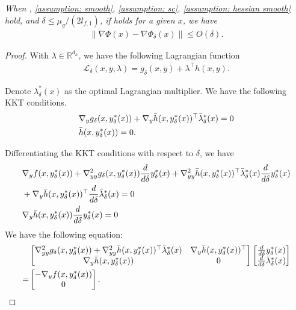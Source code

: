 \documentclass{article}
\newcommand{\Lc}{\mathcal{L}}
\def\R{\mathbb{R}}
\theoremstyle{plain}
\theoremstyle{definition}
\theoremstyle{remark}
\begin{document}
\subsection*{}
\emph{When , \ref{assumption: smooth}, \ref{assumption: sc}, \ref{assumption: hessian smooth} hold, and $\delta \leq \mu_g/(2l_{f,1})$, if  holds for a given $x$, we have
    \begin{align*}
        \|\nabla \Phi(x)-\nabla \Phi_\delta(x)\|\leq O(\delta).
    \end{align*}}

\begin{proof}

With $\lambda\in \R^{d_h}$, we have the following Lagrangian function
\begin{align*}
    \Lc_\delta(x,y, \lambda)=g_\delta(x,y) + \lambda^\top h(x,y).
\end{align*}

Denote $\lambda_\delta^*(x)$ as the optimal Lagrangian multiplier. We have the following KKT conditions.
\begin{align*}
    &\nabla_y g_\delta(x, y^*_\delta(x))+\nabla_y\Bar{h}(x,y^*_\delta(x))^\top \Bar{\lambda}^*_\delta(x)=0\\
    &\Bar{h}(x,y^*_\delta(x))=0.
\end{align*}



Differentiating the KKT conditions with respect to $\delta$, we have
\begin{align*}
    &\nabla_y f(x, y^*_\delta(x))+\nabla^2_{yy} g_\delta(x, y^*_\delta(x))\frac{d}{d \delta} y^*_\delta(x)+\nabla^2_{yy}\Bar{h}(x,y^*_\delta(x))^\top \Bar{\lambda}^*_\delta(x)\frac{d}{d \delta} y^*_\delta(x)\\
    &+\nabla_y\Bar{h}(x,y^*_\delta(x))^\top \frac{d}{d \delta}\Bar{\lambda}^*_\delta(x)=0\\
    &\nabla_y \Bar{h}(x,y^*_\delta(x))\frac{d}{d \delta} y^*_\delta(x)=0
\end{align*}
We have the following equation:
\begin{align}
&\begin{bmatrix}
\nabla^2_{yy} g_\delta(x, y^*_\delta(x))+\nabla^2_{yy}\Bar{h}(x,y^*_\delta(x))^\top\Bar{\lambda}^*_\delta(x) & \nabla_y\Bar{h}(x,y^*_\delta(x))^\top \\
\nabla_y\Bar{h}(x,y^*_\delta(x)) & 0
\end{bmatrix}
\begin{bmatrix}
\frac{d}{d \delta} y^*_\delta(x) \\
\frac{d}{d \delta} \Bar{\lambda}^*_\delta(x)
\end{bmatrix}\nonumber
\\
=&
\begin{bmatrix}
-\nabla_y f(x, y^*_\delta(x))\\
0
\end{bmatrix}\label{eq: nabla y delta}.
\end{align}


\end{proof}
\end{document}
